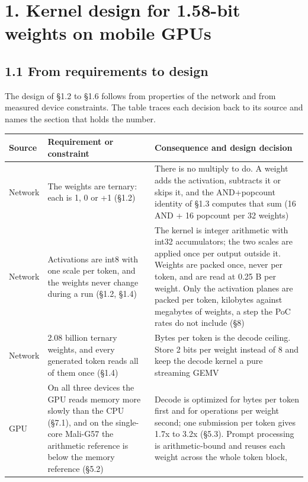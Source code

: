 \documentclass[
  10pt,
]{article}
\newcounter{none} %
\begin{document}
\section{1. Kernel design for 1.58-bit weights on mobile GPUs}\label{kernel-design-for-1.58-bit-weights-on-mobile-gpus}

\subsection{1.1 From requirements to design}\label{from-requirements-to-design}

The design of \S{}1.2 to \S{}1.6 follows from properties of the network
and from measured device constraints. The table traces each decision
back to its source and names the section that holds the number.

{\def\LTcaptype{none} %
\begin{longtable}[]{@{}p{2.2cm}p{5.9cm}p{7.9cm}@{}}
\toprule\noalign{}
Source & Requirement or constraint & Consequence and design decision \\
\midrule\noalign{}
\endhead%
\bottomrule\noalign{}
\endlastfoot%
Network & The weights are ternary: each is \textminus{}1, 0 or +1
(\S{}1.2) & There is no multiply to do. A weight adds the activation,
subtracts it or skips it, and the AND+popcount identity of \S{}1.3
computes that sum (16 AND + 16 popcount per 32 weights) \\
Network & Activations are int8 with one scale per token, and the weights
never change during a run (\S{}1.2, \S{}1.4) & The kernel is integer
arithmetic with int32 accumulators; the two scales are applied once per
output outside it. Weights are packed once, never per token, and are
read at 0.25 B per weight. Only the activation planes are packed per
token, kilobytes against megabytes of weights, a step the PoC rates do
not include (\S{}8) \\
Network & 2.08 billion ternary weights, and every generated token reads
all of them once (\S{}1.4) & Bytes per token is the decode ceiling.
Store 2 bits per weight instead of 8 and keep the decode kernel a pure
streaming GEMV \\
GPU & On all three devices the GPU reads memory more slowly than the CPU
(\S{}7.1), and on the single-core Mali-G57 the arithmetic reference is
below the memory reference (\S{}5.2) & Decode is optimized for bytes per
token first and for operations per weight second; one submission per
token gives 1.7x to 3.2x (\S{}5.3). Prompt processing is
arithmetic-bound and reuses each weight across the whole token block,

\end{longtable}}
\end{document}
